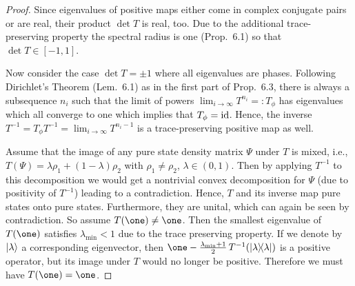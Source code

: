 \documentclass[11pt,a4paper]{article}
\theoremstyle{plain}
\theoremstyle{definition}
\theoremstyle{remark}
\begin{document}
\begin{proof}
    Since eigenvalues of positive maps either come in complex conjugate pairs or are
    real, their product $\det T$ is real, too. Due to the additional trace-preserving
    property the spectral radius is one (Prop.~6.1) so that $\det T\in[-1,1]$.

    Now consider the case $\det T=\pm 1$ where all eigenvalues are phases. Following
    Dirichlet's Theorem (Lem.~6.1) as in the first part of Prop.~6.3, there is always
    a subsequence $n_i$ such that the limit of powers $\lim_{i\to\infty} T^{n_i}=:T_\phi$
    has eigenvalues which all converge to one which implies that $T_\phi=\mathrm{id}$. Hence,
    the inverse $T^{-1} = T_\phi T^{-1} = \lim_{i\to\infty} T^{n_i-1}$ is a trace-preserving
    positive map as well.

    Assume that the image of any pure state density matrix $\Psi$ under $T$ is mixed,
    i.e., $T(\Psi)=\lambda\rho_1+(1-\lambda)\rho_2$ with $\rho_1\neq\rho_2$,
    $\lambda\in(0,1)$. Then by applying $T^{-1}$ to this decomposition we would get a
    nontrivial convex decomposition for $\Psi$ (due to positivity of $T^{-1}$) leading
    to a contradiction. Hence, $T$ and its inverse map pure states onto pure states.
    Furthermore, they are unital, which can again be seen by contradiction. So assume
    $T(\one)\neq \one$. Then the smallest eigenvalue of $T(\one)$ satisfies
    $\lambda_{\min}<1$ due to the trace preserving property. If we denote by $|\lambda\rangle$
    a corresponding eigenvector, then $\one - \frac{\lambda_{\min}+1}{2}\,T^{-1}(\ket{\lambda}\!\bra{\lambda})$
    is a positive operator, but its image under $T$ would no longer be positive.
    Therefore we must have $T(\one)=\one$.


\end{proof}
\end{document}
